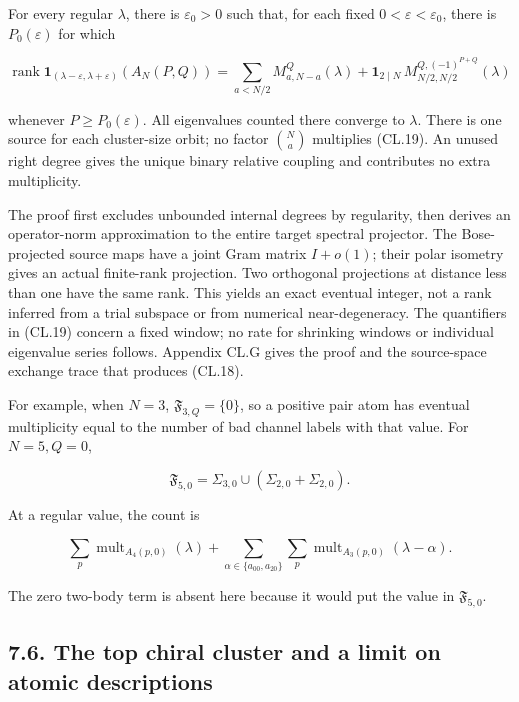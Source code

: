 \documentclass[a4paper,11pt]{article}
\numberwithin{equation}{section}
\begin{document}
For every regular \(\lambda\), there is \(\varepsilon_0>0\) such that, for each fixed \(0<\varepsilon<\varepsilon_0\), there is \(P_0(\varepsilon)\) for which

\[
\operatorname{rank}\mathbf1_{(\lambda-\varepsilon,\lambda+\varepsilon)}(A_N(P,Q))
=\sum_{a<N/2}M_{a,N-a}^{Q}(\lambda)
+\mathbf1_{2\mid N}\,M_{N/2,N/2}^{Q,(-1)^{P+Q}}(\lambda)
\tag{CL.19}
\]

whenever \(P\geq P_0(\varepsilon)\). All eigenvalues counted there converge to \(\lambda\). There is one source for each cluster-size orbit; no factor \(\binom Na\) multiplies (CL.19). An unused right degree gives the unique binary relative coupling and contributes no extra multiplicity.

The proof first excludes unbounded internal degrees by regularity, then derives an operator-norm approximation to the entire target spectral projector. The Bose-projected source maps have a joint Gram matrix \(I+o(1)\); their polar isometry gives an actual finite-rank projection. Two orthogonal projections at distance less than one have the same rank. This yields an exact eventual integer, not a rank inferred from a trial subspace or from numerical near-degeneracy. The quantifiers in (CL.19) concern a fixed window; no rate for shrinking windows or individual eigenvalue series follows. Appendix CL.G gives the proof and the source-space exchange trace that produces (CL.18).

For example, when \(N=3\), \(\mathfrak F_{3,Q}=\{0\}\), so a positive pair atom has eventual multiplicity equal to the number of bad channel labels with that value. For \(N=5,Q=0\),

\[
\mathfrak F_{5,0}=\Sigma_{3,0}\cup(\Sigma_{2,0}+\Sigma_{2,0}).
\]

At a regular value, the count is

\[
\sum_p\operatorname{mult}_{A_4(p,0)}(\lambda)
+\sum_{\alpha\in\{a_{00},a_{20}\}}\sum_p
\operatorname{mult}_{A_3(p,0)}(\lambda-\alpha).
\]

The zero two-body term is absent here because it would put the value in \(\mathfrak F_{5,0}\).

\hypertarget{the-top-chiral-cluster-and-a-limit-on-atomic-descriptions}{%
\subsection{7.6. The top chiral cluster and a limit on atomic descriptions}\label{the-top-chiral-cluster-and-a-limit-on-atomic-descriptions}}
\end{document}
